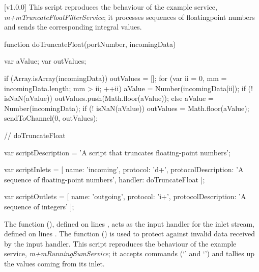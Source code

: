 [v1.0.0]
This script reproduces the behaviour of the example service,
\emph{m+mTruncateFloatFilterService}; it processes sequences of floating\longDash{}point
numbers and sends the corresponding integral values.
\codeBegin
\begin{listing}[5]{1}
function doTruncateFloat(portNumber, incomingData)
{
    var aValue;
    var outValues;
    
    if (Array.isArray(incomingData))
    {
        outValues = [];
        for (var ii = 0, mm = incomingData.length; mm > ii; ++ii)
        {
            aValue = Number(incomingData[ii]);
            if (! isNaN(aValue))
            {
                outValues.push(Math.floor(aValue));
            }
        }
    }
    else
    {
        aValue = Number(incomingData);
        if (! isNaN(aValue))
        {
            outValues = Math.floor(aValue);
        }
    }
    sendToChannel(0, outValues);
} // doTruncateFloat

var scriptDescription = 'A script that truncates floating-point numbers';

var scriptInlets = [ { name: 'incoming', protocol: 'd+',
                        protocolDescription: 'A sequence of floating-point numbers',
                        handler: doTruncateFloat } ];

var scriptOutlets = [ { name: 'outgoing', protocol: 'i+',
                        protocolDescription: 'A sequence of integers' } ];
\end{listing}
\codeEnd{}
The function (), defined on lines \longDash{},
acts as the input handler for the inlet stream, defined on lines
\longDash{}.
The function () is used to protect against invalid data received by the
input handler.
\secondaryEnd
\condPage
{}
This script reproduces the behaviour of the example service,
\emph{m+mRunningSumService}; it accepts commands (`' and
`') and tallies up the values coming from its inlet.
\codeBegin
